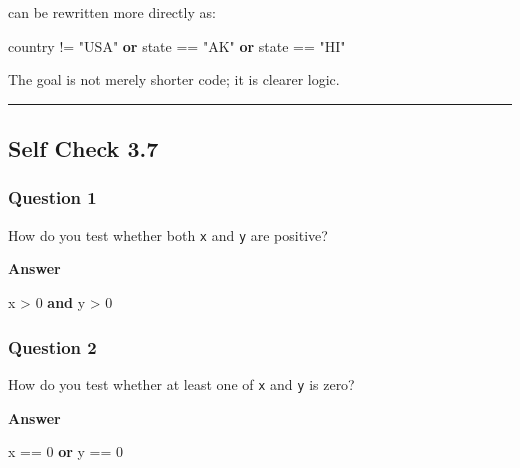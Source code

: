 \documentclass[
  11pt,
  a4paper,
]{article}
\newenvironment{Shaded}{}{}
\newcommand{\DecValTok}[1]{\textcolor[rgb]{0.25,0.63,0.44}{#1}}
\newcommand{\KeywordTok}[1]{\textcolor[rgb]{0.00,0.44,0.13}{\textbf{#1}}}
\newcommand{\NormalTok}[1]{#1}
\newcommand{\OperatorTok}[1]{\textcolor[rgb]{0.40,0.40,0.40}{#1}}
\newcommand{\StringTok}[1]{\textcolor[rgb]{0.25,0.44,0.63}{#1}}
\begin{document}
can be rewritten more directly as:

\begin{Shaded}
\begin{Highlighting}[]
\NormalTok{country }\OperatorTok{!=} \StringTok{"USA"} \KeywordTok{or}\NormalTok{ state }\OperatorTok{==} \StringTok{"AK"} \KeywordTok{or}\NormalTok{ state }\OperatorTok{==} \StringTok{"HI"}
\end{Highlighting}
\end{Shaded}

The goal is not merely shorter code; it is clearer logic.

\begin{center}\rule{0.5\linewidth}{0.5pt}\end{center}

\subsection{Self Check 3.7}\label{self-check-3.7}

\subsubsection{Question 1}\label{question-1-6}

How do you test whether both \texttt{x} and \texttt{y} are positive?

\textbf{Answer}

\begin{Shaded}
\begin{Highlighting}[]
\NormalTok{x }\OperatorTok{\textgreater{}} \DecValTok{0} \KeywordTok{and}\NormalTok{ y }\OperatorTok{\textgreater{}} \DecValTok{0}
\end{Highlighting}
\end{Shaded}

\subsubsection{Question 2}\label{question-2-6}

How do you test whether at least one of \texttt{x} and \texttt{y} is
zero?

\textbf{Answer}

\begin{Shaded}
\begin{Highlighting}[]
\NormalTok{x }\OperatorTok{==} \DecValTok{0} \KeywordTok{or}\NormalTok{ y }\OperatorTok{==} \DecValTok{0}
\end{Highlighting}
\end{Shaded}
\end{document}
